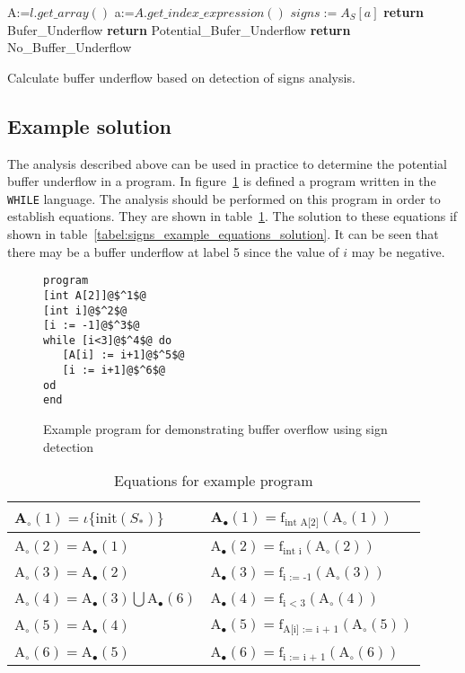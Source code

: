 \begin{algorithm}
 \begin{algorithmic}[1]
\State A:=$l.get\_array()$
\State a:=$A.get\_index\_expression()$
\State $signs:=A_S[a]$
\State \textbf{return} Bufer\_Underflow
\State \textbf{return} Potential\_Bufer\_Underflow
\Else
\State \textbf{return} No\_Buffer\_Underflow
\EndIf 
 \EndProcedure
 \end{algorithmic}
 \caption{Calculate buffer underflow based on detection of signs analysis.}
 \label{algorithm:bufferoverflow1}
\end{algorithm}

\subsection{Example solution}
The analysis described above can be used in practice to determine the potential buffer underflow in a program. In figure~\ref{code:array_example} is defined a program written in the \texttt{WHILE} language. The analysis should be performed on this program in order to establish equations. They are shown in table~\ref{tabel:signs_example_equations}. The solution to these equations if shown in table~\ref{tabel:signs_example_equations_solution}. It can be seen that there may be a buffer underflow at label 5 since the value of $i$ may be negative.

\begin{figure}
  \begin{lstlisting}
program
[int A[2]]@$^1$@
[int i]@$^2$@
[i := -1]@$^3$@
while [i<3]@$^4$@ do
   [A[i] := i+1]@$^5$@
   [i := i+1]@$^6$@
od
end
 \end{lstlisting}
 \caption{Example program for demonstrating buffer overflow using sign detection}
 \label{code:array_example}
\end{figure}
\begin{table}
\begin{tabular}{| l | l |}
\hline
A$_\circ (1) = \iota \{\text{init}(S_*) \} $ & A$_\bullet(1) = \text{f}_{\text{int A[2]}} (\text{A}_\circ (1))$ \\
\hline
A$_\circ (2) =$A$_\bullet(1) $ & A$_\bullet(2) = \text{f}_{\text{int i}} (\text{A}_\circ (2))$ \\
\hline
A$_\circ (3) = $A$_\bullet(2)$ & A$_\bullet(3) = \text{f}_{\text{i := -1}} (\text{A}_\circ (3))$  \\
\hline
A$_\circ (4) = $A$_\bullet(3) \bigcup $A$_\bullet(6) $ & A$_\bullet(4) = \text{f}_{\text{i < 3}} (\text{A}_\circ (4))$ \\
\hline
A$_\circ (5) = $A$_\bullet(4)$ & A$_\bullet(5) = \text{f}_{\text{A[i] := i + 1}} (\text{A}_\circ (5))$ \\
\hline
A$_\circ (6) = $A$_\bullet(5)$ & A$_\bullet(6) = \text{f}_{\text{i := i + 1}} (\text{A}_\circ (6))$ \\
\hline
\end{tabular}
\centering
\caption{Equations for example program}
\label{tabel:signs_example_equations}
\end{table}


